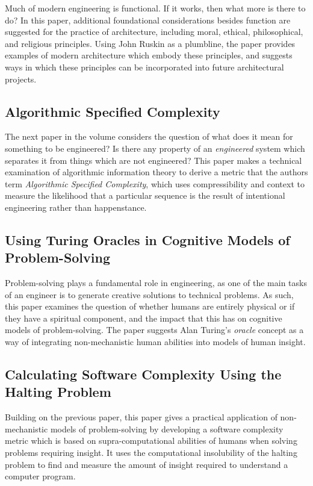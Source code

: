 Much of modern engineering is functional.  If it works, then what more is there to do?  
In this paper, additional foundational considerations besides function are suggested
for the practice of architecture, including moral, ethical, philosophical, and religious
principles.  Using John Ruskin as a plumbline, the paper provides examples of modern 
architecture which embody these principles, and suggests ways in which these principles
can be incorporated into future architectural projects.

\subsection*{Algorithmic Specified Complexity}

The next paper in the volume considers the question of what does it mean for something
to be engineered?  Is there any property of an \emph{engineered} system which separates
it from things which are not engineered?  This paper makes a technical examination of 
algorithmic information theory to derive a metric that the authors term
\emph{Algorithmic Specified Complexity}, which uses compressibility and context to 
measure the likelihood that a particular sequence is the result of intentional engineering rather
than happenstance.

\subsection*{Using Turing Oracles in Cognitive Models of Problem-Solving}

Problem-solving plays a fundamental role in engineering, as one of the main tasks of an engineer
is to generate creative solutions to technical problems.  As such, this paper examines 
the question of whether humans are entirely physical or if they have
a spiritual component, and the impact that this has on cognitive models of problem-solving.  The
paper suggests Alan Turing's \emph{oracle} concept as a way of integrating non-mechanistic human
abilities into models of human insight.

\subsection*{Calculating Software Complexity Using the Halting Problem}

Building on the previous paper, this paper gives a practical application of non-mechanistic
models of problem-solving by developing a software complexity metric which is based on 
supra-computational abilities of humans when solving problems requiring insight.  It uses
the computational insolubility of the halting problem to find and measure the amount of 
insight required to understand a computer program.

